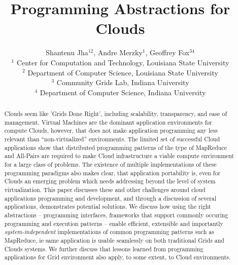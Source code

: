 \documentclass{article}
\begin{document}
\title{\large Programming Abstractions for Clouds}

\author{Shantenu Jha$^{12}$,
        Andre Merzky$^{1}$,
        Geoffrey Fox$^{34}$\\[1em]
        $^1$ \small
          Center for Computation and Technology, 
          Louisiana State University\\[-0.3em]
        $^2$ \small
          Department of Computer Science, 
          Louisiana State University\\[-0.3em]
        $^3$ \small
          Community Grids Lab, 
          Indiana University\\[-0.3em]
        $^4$ \small
          Department of Computer Science, 
          Indiana University
       }

\maketitle

\begin{abstract}

  \noindent

  Clouds seem like 'Grids Done Right', including scalability,
  transparency, and ease of management. Virtual Machines are the
  dominant application environments for compute Clouds, however, that
  does not make application programming any less relevant than
  ``non-virtualized'' environments.  The limited set of successful
  Cloud applications show that distributed programming patterns of the
  type of
  MapReduce and All-Pairs are
  required %
  to make Cloud infrastructure a viable compute environment for a
  large class of problems.  The existence of multiple implementations
  of these programming paradigms also makes clear, that application
  portability is, even for Clouds an emerging problem which needs
  addressing beyond the level of system virtualization. %
  This paper discusses these and other challenges around cloud
  applications programming and development, and through a discussion
  of several applications, demonstrates potential solutions. We
  discuss how using the right abstractions -- programming interfaces,
  frameworks that support commonly occuring programming and execution
  patterns -- enable efficient, extensible and importantly {\it
    system-independent} implementations of common programming patterns
  such as MapReduce, ie same application is usable seamlessly on both
  traditional Grids and Clouds systems. We further discuss that
  lessons learned from programming applications for Grid environment
  also apply, to some extent, to Cloud environments.

\end{abstract}
\end{document}
